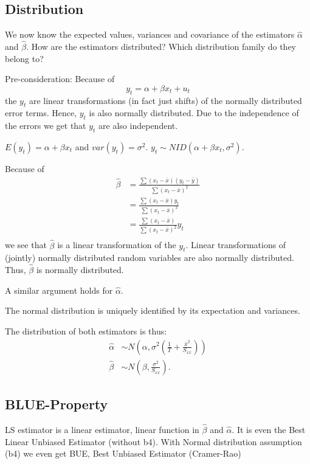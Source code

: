 \documentclass{article}
\begin{document}
\subsection*{Distribution}
We now know the expected values, variances and covariance of the estimators $\hat\alpha$ and $\hat\beta$. How are the estimators distributed? Which distribution family do they belong to?

Pre-consideration: Because of
\[ y_t=\alpha+\beta x_t+u_t \]
the $y_t$ are linear transformations (in fact just shifts) of the normally distributed error terms.
Hence, $y_t$ is also normally distributed. Due to the independence of the errors we get that $y_t$ are also independent.

$E(y_t) = \alpha + \beta x_t$ and $var(y_t) = \sigma^2$. $y_t \sim NID (\alpha + \beta x_t, \sigma^2)$.

Because of
\begin{align*}
\hat\beta &=\frac{\sum (x_t-\bar{x})(y_t-\bar{y})}{\sum (x_t-\bar{x})^2} \\
&=\frac{\sum (x_t-\bar{x})y_t}{\sum (x_t-\bar{x})^2}\\
&=\frac{\sum (x_t-\bar{x})}{\sum (x_t-\bar{x})^2}y_t\\
\end{align*}
we see that $\hat\beta$ is a linear transformation of the $y_t$. Linear transformations of (jointly) normally distributed random variables are also normally distributed. Thus, $\hat\beta$ is normally distributed. 

A similar argument holds for $\hat\alpha$.

The normal distribution is uniquely identified by its expectation and variances.

The distribution of both estimators is thus:
\begin{align*}
\hat\alpha &\sim N\left(\alpha,\sigma^2\left(\frac{1}{T}+\frac{\bar x^2}{S_{xx}}\right)\right)\\
\hat\beta &\sim N\left(\beta,\frac{\sigma^2}{S_{xx}}\right).
\end{align*}

\subsection*{BLUE-Property} 
LS estimator is a linear estimator, linear function in $\hat{\beta}$ and $\hat{\alpha}$. It is even the Best Linear Unbiased Estimator (without b4). With Normal distribution assumption (b4) we even get BUE, Best Unbiased Estimator (Cramer-Rao)
\end{document}
